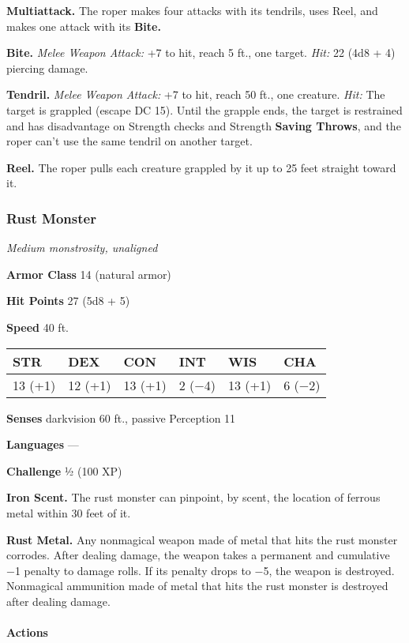 \documentclass[
]{article}
\begin{document}
\textbf{Multiattack.} The roper makes four attacks with its tendrils,
uses Reel, and makes one attack with its \textbf{Bite.}

\textbf{Bite.} \emph{Melee Weapon Attack:} +7 to hit, reach 5 ft., one
target. \emph{Hit:} 22 (4d8 + 4) piercing damage.

\textbf{Tendril.} \emph{Melee Weapon Attack:} +7 to hit, reach 50 ft.,
one creature. \emph{Hit:} The target is grappled (escape DC 15). Until
the grapple ends, the target is restrained and has disadvantage on
Strength checks and Strength \textbf{Saving Throws}, and the roper can't
use the same tendril on another target.

\textbf{Reel.} The roper pulls each creature grappled by it up to 25
feet straight toward it.

\hypertarget{rust-monster}{%
\subsubsection{Rust Monster}\label{rust-monster}}

\emph{Medium monstrosity, unaligned}

\textbf{Armor Class} 14 (natural armor)

\textbf{Hit Points} 27 (5d8 + 5)

\textbf{Speed} 40 ft.

\begin{longtable}[]{@{}llllll@{}}
\toprule
STR & DEX & CON & INT & WIS & CHA\tabularnewline
\midrule
\endhead
13 (+1) & 12 (+1) & 13 (+1) & 2 (−4) & 13 (+1) & 6 (−2)\tabularnewline
\bottomrule
\end{longtable}

\textbf{Senses} darkvision 60 ft., passive Perception 11

\textbf{Languages} ---

\textbf{Challenge} ½ (100 XP)

\textbf{Iron Scent.} The rust monster can pinpoint, by scent, the
location of ferrous metal within 30 feet of it.

\textbf{Rust Metal.} Any nonmagical weapon made of metal that hits the
rust monster corrodes. After dealing damage, the weapon takes a
permanent and cumulative −1 penalty to damage rolls. If its penalty
drops to −5, the weapon is destroyed. Nonmagical ammunition made of
metal that hits the rust monster is destroyed after dealing damage.

\hypertarget{actions-4}{%
\paragraph{Actions}\label{actions-4}}
\end{document}
